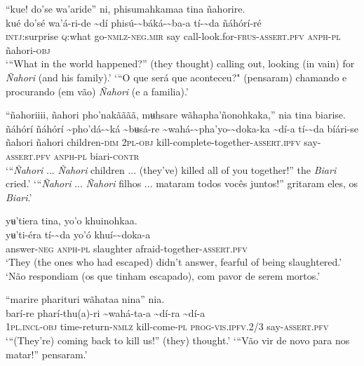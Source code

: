 \documentclass[output=paper,
modfonts,nonflat
]{langsci/langscibook}
\begin{document}
\ea “kue! do'se wa'aride” ni, phisumahkamaa tina ñahorire. \\[.3em]
\gll kué	do'sé	wa'á-ri-de{\footnotemark}	{\textasciitilde}dí	phisú-{\textasciitilde}báká-{\textasciitilde}ba-a	tí-{\textasciitilde}da	ñáhórí-ré \\
     \textsc{intj}:surprise	\textsc{q:}what	go\textsc{-nmlz-neg.mir}	say	call-look.for-\textsc{frus-assert.pfv}	\textsc{anph-pl}	ñahori\textsc{-obj}\\
\glt ‘“What in the world happened?” (they thought) calling out, looking (in vain) for \textit{Ñahori} (and his family).’
\newpage 
\glt ‘“O que será que aconteceu?" (pensaram) chamando e procurando (em vão) \textit{Ñahori} (e a familia).’
\z

\ea “ñahoriiii, ñahori pho'nakãããã, mʉhsare wãhapha'ñonohkaka,” nia tina biarise.\\[.3em]
\gll ñáhórí	ñáhórí	{\textasciitilde}pho'dá-{\textasciitilde}ká	{\textasciitilde}bʉsá-re	{\textasciitilde}wahá-{\textasciitilde}pha'yo-{\textasciitilde}doka-ka {\textasciitilde}dí-a	tí-{\textasciitilde}da	bíári-se\\
     ñahori	ñahori	children-\textsc{dim}	2\textsc{pl-obj}	kill-complete-together-\textsc{assert.ipfv} say-\textsc{assert.pfv}	\textsc{anph-pl}	biari-\textsc{contr}\\
\glt ‘“\textit{Ñahori} ... \textit{Ñahori} children ... (they've) killed all of you together!” the \textit{Biari} cried.’
\glt ‘“\textit{Ñahori} ... \textit{Ñahori} filhos ... mataram todos vocês juntos!” gritaram eles, os \textit{Biari}.’
\z 

\ea yʉ'tiera tina, yo'o khuinohkaa.\\[.3em]
\gll yʉ'ti-éra	tí-{\textasciitilde}da	yo'ó	khuí-{\textasciitilde}doka-a\\
     answer\textsc{-neg}	\textsc{anph-pl}	slaughter	afraid-together-\textsc{assert.pfv}\\
\glt ‘They (the ones who had escaped) didn't answer, fearful of being slaughtered.’
\glt ‘Não respondiam (os que tinham escapado), com pavor de serem mortos.’
\z 

\ea “marire pharituri wãhataa nina” nia.\\[.3em]
\gll {\textasciitilde}barí-re	pharí-thu(a)-ri	{\textasciitilde}wahá-ta-a	{\textasciitilde}dí-ra	{\textasciitilde}dí-a\\
     1\textsc{pl.incl-obj}	time-return-\textsc{nmlz}	kill-come-\textsc{pl}	\textsc{prog-vis.ipfv.}2/3	say-\textsc{assert.pfv}\\
\glt ‘“(They're) coming back to kill us!” (they) thought.’
\glt ‘“Vão vir de novo para nos matar!” pensaram.’
\z 
\end{document}
